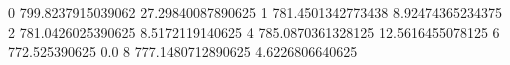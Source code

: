 0 799.8237915039062 27.29840087890625
1 781.4501342773438 8.92474365234375
2 781.0426025390625 8.5172119140625
4 785.0870361328125 12.5616455078125
6 772.525390625 0.0
8 777.1480712890625 4.6226806640625
